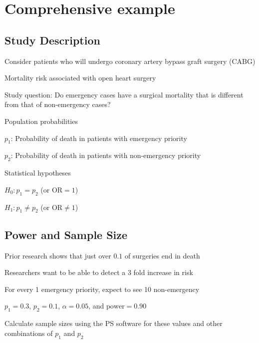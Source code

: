 \section{Comprehensive example}

\subsection{Study Description}
\bi
  \item Consider patients who will undergo coronary artery bypass graft surgery (CABG)
  \item Mortality risk associated with open heart surgery
  \item Study question: Do emergency cases have a surgical mortality that is different from that of non-emergency cases?
  \item Population probabilities
  \bi
    \item $p_1$: Probability of death in patients with emergency priority
    \item $p_2$: Probability of death in patients with non-emergency priority
  \ei
  \item Statistical hypotheses
  \bi
  \item $H_0: p_1 = p_2$ (or $\textrm{OR} = 1$)
  \item $H_1: p_1 \neq p_2$ (or $\textrm{OR} \neq 1$)
  \ei
\ei

\subsection{Power and Sample Size}

\bi
  \item Prior research shows that just over $0.1$ of surgeries end in death
  \item Researchers want to be able to detect a 3 fold increase in risk
  \item For every 1 emergency priority, expect to see 10 non-emergency
  \item $p_1 = 0.3$, $p_2 = 0.1$, $\alpha = 0.05$, and $\textrm{power} = 0.90$
  \item Calculate sample sizes using the PS software for these values and other combinations of $p_1$ and $p_2$
\ei

